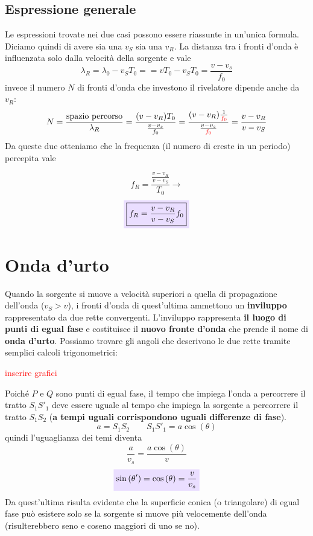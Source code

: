 \documentclass[x11names]{report}
\newcommand{\viola}[1]{\colorbox{yred}{$\displaystyle #1$}}
\begin{document}
		\subsection{Espressione generale}
	Le espressioni trovate nei due casi possono essere riassunte in un'unica formula. Diciamo quindi di avere sia una \(v_S\) sia una \(v_R\). La distanza tra i fronti d'onda è influenzata solo dalla velocità della sorgente e vale
	\[ 
	\lambda_R = \lambda_0 - v_ST_0 = = vT_0 - v_ST_0 = \frac{v - v_s}{f_0}
	\]
	invece il numero \(N\) di fronti d'onda che investono il rivelatore dipende anche da \(v_R\):
	\[ 
	N = \frac{\text{spazio percorso}}{\lambda_R} = \frac{(v - v_R)T_0}{\frac{v - v_s}{f_0}} = \frac{(v - v_R)\frac{1}{\textcolor{red}{f_0}}}{\frac{v - v_s}{\textcolor{red}{f_0}}} = \frac{v - v_R}{v - v_S}
	\]
	Da queste due otteniamo che la frequenza (il numero di creste in un periodo) percepita vale
	
	\[ 
	f_R = \frac{\frac{v - v_R}{v-v_S}}{T_0} \to
	\]
	\begin{equation}
		  \viola{\boxed{f_R = \frac{v - v_R}{v-v_S}f_0}}
	\end{equation}

	\section{Onda d'urto}
	Quando la sorgente si muove a velocità superiori a quella di propagazione dell'onda (\(v_S > v\)), i fronti d'onda di quest'ultima ammettono un \textbf{inviluppo} rappresentato da due rette convergenti. L'inviluppo rappresenta \textbf{il luogo di punti di egual fase} e costituisce il  \textbf{nuovo fronte d'onda} che prende il nome di \textbf{onda d'urto}. Possiamo trovare gli angoli che descrivono le due rette tramite semplici calcoli trigonometrici: 
	\begin{center}
		\textcolor{red}{inserire grafici}
	\end{center}
	Poiché \(P\) e \(Q\) sono punti di egual fase, il tempo che impiega l'onda a percorrere il tratto \(S_1S'_1\) deve essere uguale al tempo che impiega la sorgente a percorrere il tratto \(S_1S_2\) (\textbf{a tempi uguali corrispondono uguali differenze di fase}).
	\[ 
	\boxed{a = S_1S_2} \qquad \boxed{S_1S'_1 = a\cos\left(\theta\right)}
	\]
	quindi l'uguaglianza dei temi diventa
	\[ 
	\frac{a}{v_s} = \frac{a\cos\left(\theta\right)}{v}
	\]
	\begin{equation}
		\viola{\sin\left(\theta'\right) = \cos\left(\theta\right) = \frac{v}{v_s} }
	\end{equation}
	Da quest'ultima risulta evidente che la superficie conica (o triangolare) di egual fase può esistere solo se la sorgente si muove più velocemente dell'onda (risulterebbero seno e coseno maggiori di uno se no).
	
\end{document}
